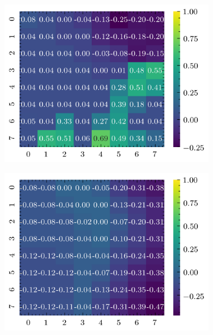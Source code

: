 \documentclass[../document.tex]{subfiles}
\begin{document}
\begin{figure}[H]
    \begin{subfigure}[b]{0.19\textwidth}
        \includegraphics[width=\linewidth]{../img/5/quarry/false_negative/heatmap-2d-0.png}
    \end{subfigure}
    \begin{subfigure}[b]{0.19\textwidth}
        \includegraphics[width=\linewidth]{../img/5/quarry/false_negative/heatmap-2d-1.png}
    \end{subfigure}  
    \begin{subfigure}[b]{0.19\textwidth}

\end{subfigure}
\end{figure}
\end{document}
